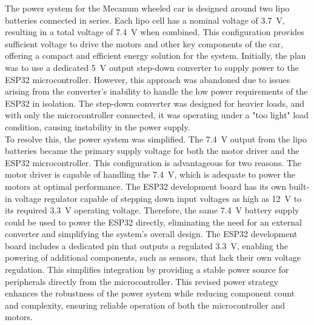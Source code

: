 The power system for the Mecanum wheeled car is designed around two \ac{lipo} batteries connected in series. Each \ac{lipo} cell has a nominal voltage of \num{3.7}~\si{\volt}, resulting in a total voltage of \num{7.4}~\si{\volt} when combined. This configuration provides sufficient voltage to drive the motors and other key components of the car, offering a compact and efficient energy solution for the system. Initially, the plan was to use a dedicated \num{5}~\si{\volt} output step-down converter to supply power to the ESP32 microcontroller. However, this approach was abandoned due to issues arising from the converter's inability to handle the low power requirements of the ESP32 in isolation. The step-down converter was designed for heavier loads, and with only the microcontroller connected, it was operating under a "too light" load condition, causing instability in the power supply.\\
To resolve this, the power system was simplified. The \num{7.4}~\si{\volt} output from the \ac{lipo} batteries became the primary supply voltage for both the motor driver and the ESP32 microcontroller. This configuration is advantageous for two reasons. The motor driver is capable of handling the \num{7.4}~\si{\volt}, which is adequate to power the motors at optimal performance. The ESP32 development board has its own built-in voltage regulator capable of stepping down input voltages as high as \num{12}~\si{\volt} to its required \num{3.3}~\si{\volt} operating voltage. Therefore, the same \num{7.4}~\si{\volt} battery supply could be used to power the ESP32 directly, eliminating the need for an external converter and simplifying the system’s overall design. The ESP32 development board includes a dedicated pin that outputs a regulated \num{3.3}~\si{\volt}, enabling the powering of additional components, such as sensors, that lack their own voltage regulation. This simplifies integration by providing a stable power source for peripherals directly from the microcontroller. This revised power strategy enhances the robustness of the power system while reducing component count and complexity, ensuring reliable operation of both the microcontroller and motors.
